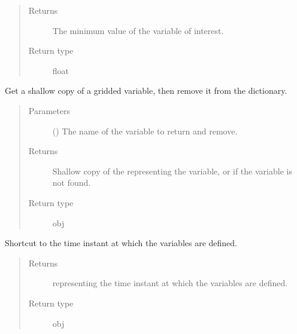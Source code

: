 \documentclass[letterpaper,10pt,english]{sphinxmanual}
\begin{document}
\begin{fulllineitems}
\begin{fulllineitems}
\begin{quote}
\begin{description}
\item[{Returns}] \leavevmode
The minimum value of the variable of interest.

\item[{Return type}] \leavevmode
float

\end{description}\end{quote}

\end{fulllineitems}


\begin{fulllineitems}
\label{\detokenize{api:storages.grid_data.GridData.pop}}
Get a shallow copy of a gridded variable, then remove it from the dictionary.
\begin{quote}\begin{description}
\item[{Parameters}] \leavevmode
{} () \textendash{} The name of the variable to return and remove.

\item[{Returns}] \leavevmode
Shallow copy of the  representing the variable, or  if the variable is not found.

\item[{Return type}] \leavevmode
obj

\end{description}\end{quote}

\end{fulllineitems}


\begin{fulllineitems}
\label{\detokenize{api:storages.grid_data.GridData.time}}
Shortcut to the time instant at which the variables are defined.
\begin{quote}\begin{description}
\item[{Returns}] \leavevmode
{} representing the time instant at which the variables are defined.

\item[{Return type}] \leavevmode
obj


\end{description}
\end{quote}
\end{fulllineitems}
\end{fulllineitems}
\end{document}
